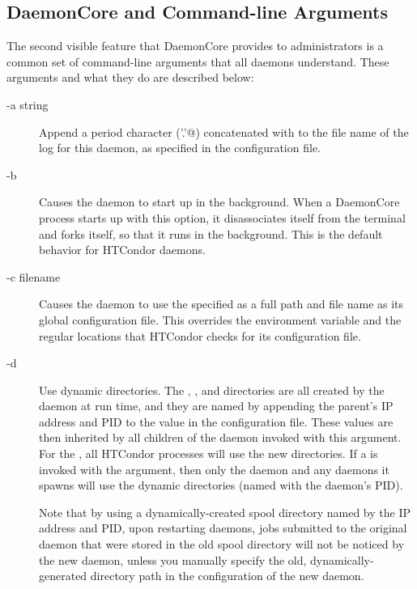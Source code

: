 \subsection{\label{sec:DaemonCore-Arguments}DaemonCore and
Command-line Arguments} 

The second visible feature that DaemonCore provides to administrators
is a common set of command-line arguments that all daemons understand.
These arguments and what they do are described below:

\begin{description}

\item[-a string] Append a period character (\verb@'.'@) concatenated with
   to the file name of the log for this daemon,
  as specified in the configuration file.

\item[-b] Causes the daemon to start up in the background.  When a
  DaemonCore process starts up with this option, it disassociates itself
  from the terminal and forks itself, so that it runs in the
  background.  This is the default behavior for HTCondor daemons.

\item[-c filename] Causes the daemon to use the specified 
  as a full path and file name as its global configuration file.  This
  overrides the  environment variable and the
  regular locations that HTCondor checks for its configuration file.

\item[-d] Use dynamic directories.
 The , , and  directories
 are all created by the daemon at run time,
 and they are named by appending the
 parent's IP address and PID to the value in the 
 configuration file.
 These values are then inherited by all children of the daemon
 invoked with this  argument.
 For the ,
 all HTCondor processes will use the new directories.
 If a  is invoked with the  argument,
 then only the  daemon and any
  daemons it spawns will use the dynamic
 directories (named with the  daemon's PID).

 Note that by using a dynamically-created spool directory
 named by the IP address and PID,
 upon restarting daemons,
 jobs submitted to the original  daemon
 that were stored in the old spool directory will not be noticed
 by the new  daemon,
 unless you manually specify the old, dynamically-generated 
  directory path in the configuration of the
 new  daemon.


\end{description}
